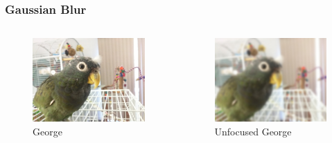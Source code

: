 \documentclass{beamer}
\begin{document}
\begin{frame}
  \frametitle{Gaussian Blur}
  \begin{columns}
    \begin{column}{0.5\textwidth}
      \begin{figure}
        \includegraphics[scale=.15]{img/george}
        \caption{George}
      \end{figure}
    \end{column}
    \begin{column}{0.5\textwidth}
      \begin{figure}
        \includegraphics[scale=.15]{img/george_blurry}
        \caption{Unfocused George}
      \end{figure}
    \end{column}
  \end{columns}
\end{frame}
\end{document}

